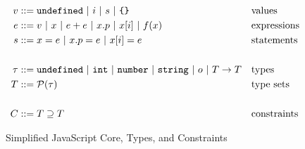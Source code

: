 \begin{figure}
\begin{align*}
v & ::= \code{undefined}\ |\ i\ |\ s\ |\ \text{\code{\{\}}} && \text{values}\\
e & ::= v\ |\ x\ |\ e + e\ |\ x.p\ |\ x[i]\ |\ f(x) && \text{expressions}\\
s & ::= x = e\ |\ x.p = e\ |\ x[i] = e && \text{statements}\\
\\
\tau & ::= \code{undefined}\ |\ \code{int}\ |\ \code{number}\ |\ \code{string}\ |\ o\ |\ T \rightarrow T && \text{types}\\
T & ::= \mathcal{P}(\tau) && \text{type sets}\\
\\
C & ::= T \supseteq T\ && \text{constraints}
\end{align*}
\caption{Simplified JavaScript Core, Types, and Constraints}
\label{fig:js-core}
\end{figure}


